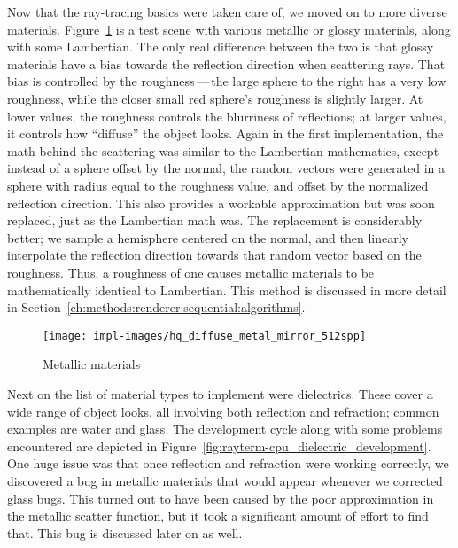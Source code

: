 Now that the ray-tracing basics were taken care of, we moved on to more diverse materials.
Figure~\ref{fig:rayterm-cpu_metallic} is a test scene with various metallic or glossy materials, along with some Lambertian.
The only real difference between the two is that glossy materials have a bias towards the reflection direction when scattering rays.
That bias is controlled by the roughness\,---\,the large sphere to the right has a very low roughness, while the closer small red sphere's roughness is slightly larger.
At lower values, the roughness controls the blurriness of reflections; at larger values, it controls how ``diffuse'' the object looks.
Again in the first implementation, the math behind the scattering was similar to the Lambertian mathematics, except instead of a sphere offset by the normal, the random vectors were generated in a sphere with radius equal to the roughness value, and offset by the normalized reflection direction.
This also provides a workable approximation but was soon replaced, just as the Lambertian math was.
The replacement is considerably better; we sample a hemisphere centered on the normal, and then linearly interpolate the reflection direction towards that random vector based on the roughness.
Thus, a roughness of one causes metallic materials to be mathematically identical to Lambertian.
This method is discussed in more detail in Section~\ref{ch:methods:renderer:sequential:algorithms}.

\vspace{0.3em}
\begin{figure}[htb]
  \centering
  \texttt{[image: impl-images/hq\_diffuse\_metal\_mirror\_512spp]}
  \caption{Metallic materials}
\label{fig:rayterm-cpu_metallic}
\end{figure}

Next on the list of material types to implement were dielectrics.
These cover a wide range of object looks, all involving both reflection and refraction; common examples are water and glass.
The development cycle along with some problems encountered are depicted in Figure~\ref{fig:rayterm-cpu_dielectric_development}.
One huge issue was that once reflection and refraction were working correctly, we discovered a bug in metallic materials that would appear whenever we corrected glass bugs.
This turned out to have been caused by the poor approximation in the metallic scatter function, but it took a significant amount of effort to find that.
This bug is discussed later on as well.

